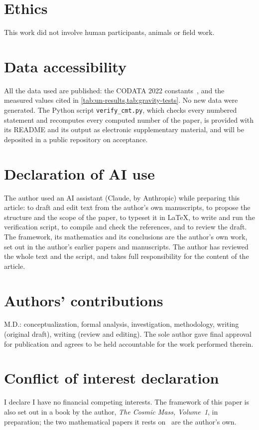 \documentclass[11pt,a4paper]{article}
\theoremstyle{plain}
\theoremstyle{definition}
\theoremstyle{remark}
\begin{document}
\section*{Ethics}
This work did not involve human participants, animals or field work.

\section*{Data accessibility}
All the data used are published: the CODATA 2022 constants~\citep{CODATA2022}, and the measured values cited in \cref{tab:un-results,tab:gravity-tests}. No new data were generated. The Python script \texttt{verify\_cmt.py}, which checks every numbered statement and recomputes every computed number of the paper, is provided with its README and its output as electronic supplementary material, and will be deposited in a public repository on acceptance.

\section*{Declaration of AI use}
The author used an AI assistant (Claude, by Anthropic) while preparing this article: to draft and edit text from the author's own manuscripts, to propose the structure and the scope of the paper, to typeset it in \LaTeX, to write and run the verification script, to compile and check the references, and to review the draft. The framework, its mathematics and its conclusions are the author's own work, set out in the author's earlier papers and manuscripts. The author has reviewed the whole text and the script, and takes full responsibility for the content of the article.

\section*{Authors' contributions}
M.D.: conceptualization, formal analysis, investigation, methodology, writing (original draft), writing (review and editing). The sole author gave final approval for publication and agrees to be held accountable for the work performed therein.

\section*{Conflict of interest declaration}
I declare I have no financial competing interests. The framework of this paper is also set out in a book by the author, \emph{The Cosmic Mass, Volume~1}, in preparation; the two mathematical papers it rests on~\citep{Derraz2026GSP,DerrazGN2026} are the author's own.
\end{document}
